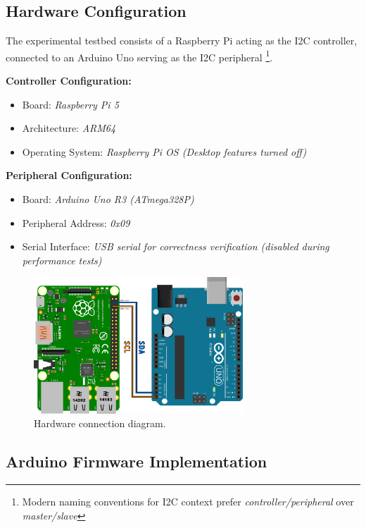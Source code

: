 \subsection{Hardware Configuration}
\label{subsec:eval-setup-hw}

The experimental testbed consists of a Raspberry Pi acting as the I2C controller, connected to an Arduino Uno serving as the I2C peripheral \footnote{Modern naming conventions for I2C context prefer \textit{controller/peripheral} over \textit{master/slave}}.

\textbf{Controller Configuration:}
\begin{itemize}
    \item Board: \textit{Raspberry Pi 5}
    \item Architecture: \textit{ARM64} %
    \item Operating System: \textit{Raspberry Pi OS (Desktop features turned off)}
\end{itemize}

\textbf{Peripheral Configuration:}
\begin{itemize}
    \item Board: \textit{Arduino Uno R3 (ATmega328P)}
    \item Peripheral Address: \textit{0x09}
    \item Serial Interface: \textit{USB serial for correctness verification (disabled during performance tests)}
\end{itemize}

\begin{figure}[h]
	\centering
	\includegraphics[width=0.7\textwidth]{images/HW_config.png}
	\caption{Hardware connection diagram.}
	\label{fig:hw-connection}
\end{figure}

\subsection{Arduino Firmware Implementation}
\label{subsec:eval-setup-fw}

